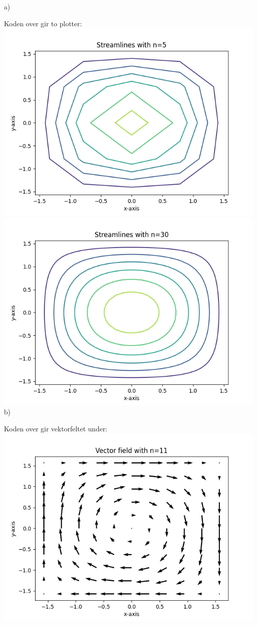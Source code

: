 \documentclass[12pt, a4paper]{article}
\begin{document}
a)

Koden over gir to plotter: \\
\hspace*{-1.5cm}
\includegraphics[scale=0.5]{strlin_5}
\includegraphics[scale=0.5]{strlin_30}\\

b)

Koden over gir vektorfeltet under: \\
\hspace*{-1.5cm}
\includegraphics[scale=1]{vec_11.png}
\end{document}
